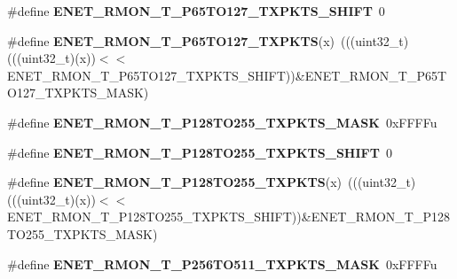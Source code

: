 \begin{DoxyCompactItemize}
\item 
\#define {\bfseries E\+N\+E\+T\+\_\+\+R\+M\+O\+N\+\_\+\+T\+\_\+\+P65\+T\+O127\+\_\+\+T\+X\+P\+K\+T\+S\+\_\+\+S\+H\+I\+FT}~0\hypertarget{group__ENET__Register__Masks_ga76051106460eb4da2d6c1349785902bf}{}\label{group__ENET__Register__Masks_ga76051106460eb4da2d6c1349785902bf}

\item 
\#define {\bfseries E\+N\+E\+T\+\_\+\+R\+M\+O\+N\+\_\+\+T\+\_\+\+P65\+T\+O127\+\_\+\+T\+X\+P\+K\+TS}(x)~(((uint32\+\_\+t)(((uint32\+\_\+t)(x))$<$$<$E\+N\+E\+T\+\_\+\+R\+M\+O\+N\+\_\+\+T\+\_\+\+P65\+T\+O127\+\_\+\+T\+X\+P\+K\+T\+S\+\_\+\+S\+H\+I\+FT))\&E\+N\+E\+T\+\_\+\+R\+M\+O\+N\+\_\+\+T\+\_\+\+P65\+T\+O127\+\_\+\+T\+X\+P\+K\+T\+S\+\_\+\+M\+A\+SK)\hypertarget{group__ENET__Register__Masks_gaa6a23d4dd439429ea0e8393c80a1b540}{}\label{group__ENET__Register__Masks_gaa6a23d4dd439429ea0e8393c80a1b540}

\item 
\#define {\bfseries E\+N\+E\+T\+\_\+\+R\+M\+O\+N\+\_\+\+T\+\_\+\+P128\+T\+O255\+\_\+\+T\+X\+P\+K\+T\+S\+\_\+\+M\+A\+SK}~0x\+F\+F\+F\+Fu\hypertarget{group__ENET__Register__Masks_gacd52bd7bd4b45906ad5f62ca31f3edda}{}\label{group__ENET__Register__Masks_gacd52bd7bd4b45906ad5f62ca31f3edda}

\item 
\#define {\bfseries E\+N\+E\+T\+\_\+\+R\+M\+O\+N\+\_\+\+T\+\_\+\+P128\+T\+O255\+\_\+\+T\+X\+P\+K\+T\+S\+\_\+\+S\+H\+I\+FT}~0\hypertarget{group__ENET__Register__Masks_ga6ff37e25aa7ff61367f6637d29189b89}{}\label{group__ENET__Register__Masks_ga6ff37e25aa7ff61367f6637d29189b89}

\item 
\#define {\bfseries E\+N\+E\+T\+\_\+\+R\+M\+O\+N\+\_\+\+T\+\_\+\+P128\+T\+O255\+\_\+\+T\+X\+P\+K\+TS}(x)~(((uint32\+\_\+t)(((uint32\+\_\+t)(x))$<$$<$E\+N\+E\+T\+\_\+\+R\+M\+O\+N\+\_\+\+T\+\_\+\+P128\+T\+O255\+\_\+\+T\+X\+P\+K\+T\+S\+\_\+\+S\+H\+I\+FT))\&E\+N\+E\+T\+\_\+\+R\+M\+O\+N\+\_\+\+T\+\_\+\+P128\+T\+O255\+\_\+\+T\+X\+P\+K\+T\+S\+\_\+\+M\+A\+SK)\hypertarget{group__ENET__Register__Masks_gac5d941cee86d2827cbbb7a52cbb771dd}{}\label{group__ENET__Register__Masks_gac5d941cee86d2827cbbb7a52cbb771dd}

\item 
\#define {\bfseries E\+N\+E\+T\+\_\+\+R\+M\+O\+N\+\_\+\+T\+\_\+\+P256\+T\+O511\+\_\+\+T\+X\+P\+K\+T\+S\+\_\+\+M\+A\+SK}~0x\+F\+F\+F\+Fu\hypertarget{group__ENET__Register__Masks_ga85bc090787f3d1078d6f9181f4bbb671}{}\label{group__ENET__Register__Masks_ga85bc090787f3d1078d6f9181f4bbb671}


\end{DoxyCompactItemize}
